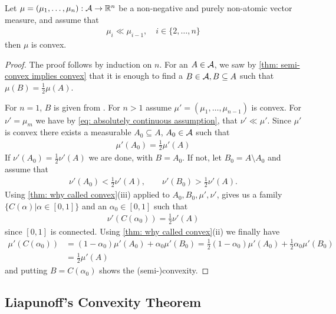 \documentclass[../../main.tex]{subfiles}
\begin{document}
\begin{lemma}\label{lem: chain of ac}
Let $\mu=(\mu_{1}, \dots, \mu_{n}):\mathcal{A}\to \mathbb{R}^{n}$ be a non-negative and purely non-atomic vector measure, and assume that
\begin{align}
	\mu_{i} \ll \mu_{i-1}, \quad i\in \{2, \dots, n \} \label{eq: absolutely continuous assumption}
\end{align}
then $\mu$ is convex.
\end{lemma}
\begin{proof}
The proof follows by induction on $n$. For an $A\in \mathcal{A}$, we saw by \cref{thm: semi-convex implies convex} that it is enough to find a $B\in \mathcal{A}, B\subseteq A$ such that $\mu(B)=\frac{1}{2}\mu(A)$.

For $n=1$, $B$ is given from . For $n>1$ assume $\mu'=(\mu_{1}, \dots, \mu_{n-1})$ is convex. For $\nu'=\mu_{m}$ we have by \eqref{eq: absolutely continuous assumption}, that $\nu' \ll \mu'$.
Since $\mu'$ is convex there exists a measurable $A_{0}\subseteq A$, $A_{0}\in \mathcal{A}$ such that
\begin{align*}
	\mu'(A_{0})=\frac{1}{2}\mu'(A)
\end{align*}
If $\nu'(A_{0})=\frac{1}{2}\nu'(A)$ we are done, with $B=A_{0}$. If not, let $B_{0}=A\setminus A_{0}$ and assume that
\begin{align*}
	\nu'(A_{0})<\frac{1}{2}\nu'(A), \qquad \nu'(B_{0})>\frac{1}{2}\nu'(A).
\end{align*}
Using \cref{thm: why called convex}(iii) applied to $A_{0}, B_{0}, \mu',\nu'$, gives us a family $\{C(\alpha)|\alpha\in[0,1]\}$ and an $\alpha_{0}\in [0,1]$ such that
\begin{align*}
	\nu'(C(\alpha_{0}))=\frac{1}{2}\nu'(A)
\end{align*}
since $[0,1]$ is connected. Using \cref{thm: why called convex}(ii) we finally have
\begin{align*}
	\mu'(C(\alpha_{0}))&=(1-\alpha_{0})\mu'(A_{0})+\alpha_{0}\mu'(B_{0}) = \frac{1}{2}(1-\alpha_{0})\mu'(A_{0})+\frac{1}{2}\alpha_{0}\mu'(B_{0}) \\
	&=\frac{1}{2}\mu'(A)
\end{align*}
and putting $B=C(\alpha_{0})$ shows the (semi-)convexity.
\end{proof}

\subsection{Liapunoff's Convexity Theorem}
\end{document}
